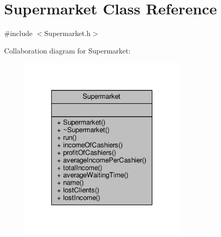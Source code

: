 \hypertarget{classSupermarket}{\section{Supermarket Class Reference}
\label{classSupermarket}
}


{\ttfamily \#include $<$Supermarket.\-h$>$}



Collaboration diagram for Supermarket\-:\nopagebreak
\begin{figure}[H]
\begin{center}
\leavevmode
\includegraphics[width=226pt]{classSupermarket__coll__graph}
\end{center}
\end{figure}
